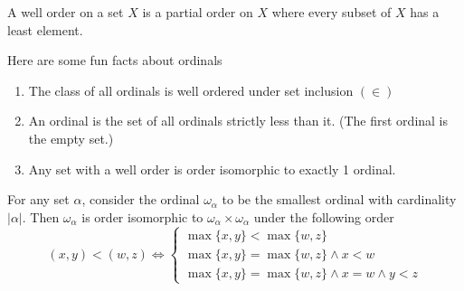 
\begin{definition}
    A well order on a set $X$ is a partial order on $X$ where every subset of $X$ has a least element.
\end{definition}
Here are some fun facts about ordinals
\begin{enumerate}
    \item The class of all ordinals is well ordered under set inclusion $(\in)$
    \item An ordinal is the set of all ordinals strictly less than it. (The first ordinal is the empty set.)
    \item Any set with a well order is order isomorphic to exactly 1 ordinal.
\end{enumerate}

\begin{theorem}
    For any set $\alpha$, consider the ordinal $\omega_\alpha$ to be the smallest ordinal with cardinality $|\alpha|$. Then $\omega_\alpha$ is order isomorphic to $\omega_\alpha \times \omega_\alpha$ under the following order
    $$
(x, y)<(w, z) \Longleftrightarrow\left\{\begin{array}{l}
\max \{x, y\}<\max \{w, z\} \\
\max \{x, y\}=\max \{w, z\} \wedge x<w \\
\max \{x, y\}=\max \{w, z\} \wedge x=w \wedge y<z
\end{array}\right.
$$
\end{theorem}
